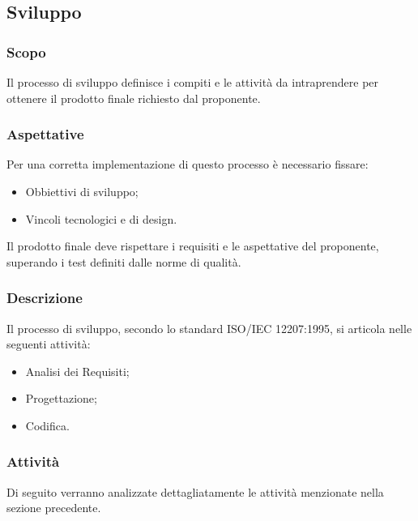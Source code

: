 \subsection{Sviluppo}
		\subsubsection{Scopo}
			Il processo di sviluppo definisce i compiti e le attività da intraprendere per ottenere il prodotto finale richiesto dal proponente.
		\subsubsection{Aspettative}
			Per una corretta implementazione di questo processo è necessario fissare:
				\begin{itemize}
					\item Obbiettivi di sviluppo;
					\item Vincoli tecnologici e di design.
				\end{itemize}	
			Il prodotto finale deve rispettare i requisiti e le aspettative del proponente, superando i test definiti dalle norme di qualità.
		\subsubsection{Descrizione}
			Il processo di sviluppo, secondo lo standard ISO/IEC 12207:1995, si articola nelle seguenti attività:
				\begin{itemize}
					\item Analisi dei Requisiti;
					\item Progettazione;
					\item Codifica.
				\end{itemize}
			
		\subsubsection{Attività}
			Di seguito verranno analizzate dettagliatamente le attività menzionate nella sezione precedente.
